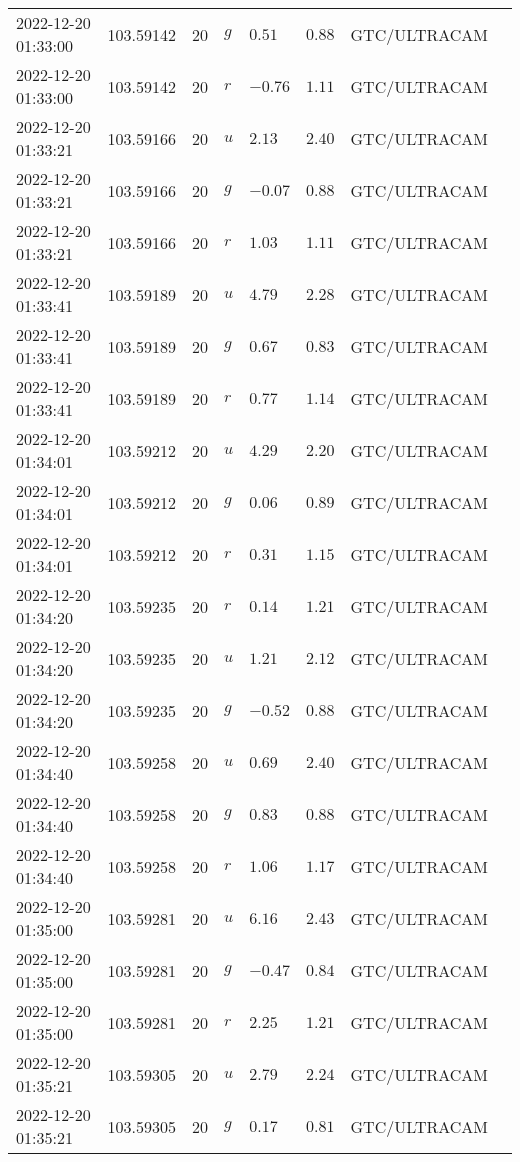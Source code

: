 \documentclass{nature_plusfigure}
\begin{document}
\begin{supplement}
\begin{center}
\begin{longtable}{llllllll}
2022-12-20 01:33:00 & 103.59142 & 20 & $g$ & $0.51$ & $0.88$ & GTC/ULTRACAM &  \\ 
2022-12-20 01:33:00 & 103.59142 & 20 & $r$ & $-0.76$ & $1.11$ & GTC/ULTRACAM &  \\ 
2022-12-20 01:33:21 & 103.59166 & 20 & $u$ & $2.13$ & $2.40$ & GTC/ULTRACAM &  \\ 
2022-12-20 01:33:21 & 103.59166 & 20 & $g$ & $-0.07$ & $0.88$ & GTC/ULTRACAM &  \\ 
2022-12-20 01:33:21 & 103.59166 & 20 & $r$ & $1.03$ & $1.11$ & GTC/ULTRACAM &  \\ 
2022-12-20 01:33:41 & 103.59189 & 20 & $u$ & $4.79$ & $2.28$ & GTC/ULTRACAM &  \\ 
2022-12-20 01:33:41 & 103.59189 & 20 & $g$ & $0.67$ & $0.83$ & GTC/ULTRACAM &  \\ 
2022-12-20 01:33:41 & 103.59189 & 20 & $r$ & $0.77$ & $1.14$ & GTC/ULTRACAM &  \\ 
2022-12-20 01:34:01 & 103.59212 & 20 & $u$ & $4.29$ & $2.20$ & GTC/ULTRACAM &  \\ 
2022-12-20 01:34:01 & 103.59212 & 20 & $g$ & $0.06$ & $0.89$ & GTC/ULTRACAM &  \\ 
2022-12-20 01:34:01 & 103.59212 & 20 & $r$ & $0.31$ & $1.15$ & GTC/ULTRACAM &  \\ 
2022-12-20 01:34:20 & 103.59235 & 20 & $r$ & $0.14$ & $1.21$ & GTC/ULTRACAM &  \\ 
2022-12-20 01:34:20 & 103.59235 & 20 & $u$ & $1.21$ & $2.12$ & GTC/ULTRACAM &  \\ 
2022-12-20 01:34:20 & 103.59235 & 20 & $g$ & $-0.52$ & $0.88$ & GTC/ULTRACAM &  \\ 
2022-12-20 01:34:40 & 103.59258 & 20 & $u$ & $0.69$ & $2.40$ & GTC/ULTRACAM &  \\ 
2022-12-20 01:34:40 & 103.59258 & 20 & $g$ & $0.83$ & $0.88$ & GTC/ULTRACAM &  \\ 
2022-12-20 01:34:40 & 103.59258 & 20 & $r$ & $1.06$ & $1.17$ & GTC/ULTRACAM &  \\ 
2022-12-20 01:35:00 & 103.59281 & 20 & $u$ & $6.16$ & $2.43$ & GTC/ULTRACAM &  \\ 
2022-12-20 01:35:00 & 103.59281 & 20 & $g$ & $-0.47$ & $0.84$ & GTC/ULTRACAM &  \\ 
2022-12-20 01:35:00 & 103.59281 & 20 & $r$ & $2.25$ & $1.21$ & GTC/ULTRACAM &  \\ 
2022-12-20 01:35:21 & 103.59305 & 20 & $u$ & $2.79$ & $2.24$ & GTC/ULTRACAM &  \\ 
2022-12-20 01:35:21 & 103.59305 & 20 & $g$ & $0.17$ & $0.81$ & GTC/ULTRACAM &  \\ 

\end{longtable}
\end{center}
\end{supplement}
\end{document}
